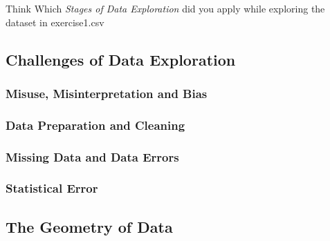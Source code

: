 \begin{DIY}{Think}
Which \emph{Stages of Data Exploration} did you apply while exploring the dataset in exercise1.csv
\end{DIY}

\subsection{Challenges of Data Exploration}
\subsubsection{Misuse, Misinterpretation and Bias}

\subsubsection{Data Preparation and Cleaning}

\subsubsection{Missing Data and Data Errors}

\subsubsection{Statistical Error}

\subsection{The Geometry of Data}
\newpage
